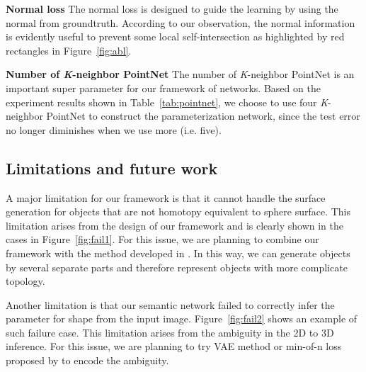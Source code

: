 \noindent\textbf{Normal loss}
The normal loss is designed to guide the learning by using the normal from groundtruth. According to our observation, the normal information is evidently useful to prevent some local self-intersection as highlighted by red rectangles in Figure~\ref{fig:abl}.

\noindent\textbf{Number of \textit{K}-neighbor PointNet}
The number of \textit{K}-neighbor PointNet is an important super parameter for our framework of networks. Based on the experiment results shown in Table~\ref{tab:pointnet}, we choose to use four \textit{K}-neighbor PointNet to construct the parameterization network, since the test error no longer diminishes when we use more (i.e. five). 


\subsection{Limitations and future work}
A major limitation for our framework is that it cannot handle the surface generation for objects that are not homotopy equivalent to sphere surface. This limitation arises from the design of our framework and is clearly shown in the cases in Figure~\ref{fig:fail1}. For this issue, we are planning to combine our framework with the method developed in \cite{assemble}. In this way, we can generate objects by several separate parts and therefore represent objects with more complicate topology.

Another limitation is that our semantic network failed to correctly infer the parameter for shape from the input image. Figure~\ref{fig:fail2} shows an example of such failure case. This limitation arises from the ambiguity in the 2D to 3D inference. For this issue, we are planning to try VAE method\cite{VAE} or min-of-n loss proposed by \cite{PSGN} to encode the ambiguity.  

